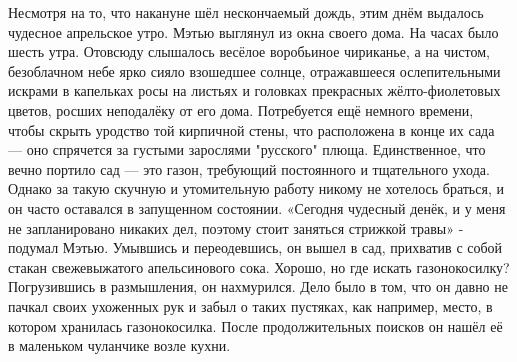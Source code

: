 \documentclass[a4paper,12pt]{book}
\begin{document}
	Несмотря на то, что накануне шёл нескончаемый дождь, этим днём выдалось чудесное апрельское утро.
	Мэтью выглянул из окна своего дома. На часах было шесть утра. Отовсюду слышалось весёлое воробьиное чириканье, а на чистом, безоблачном небе ярко сияло взошедшее солнце, отражавшееся ослепительными искрами в капельках росы на листьях и головках прекрасных жёлто-фиолетовых цветов, росших неподалёку от его дома. Потребуется ещё немного времени, чтобы скрыть уродство той кирпичной стены, что расположена в конце их сада — оно спрячется за густыми зарослями "русского" плюща. Единственное, что вечно портило сад — это газон, требующий постоянного и тщательного ухода. Однако за такую скучную и утомительную работу никому не хотелось браться, и он часто оставался в запущенном состоянии.
	«Сегодня чудесный денёк, и у меня не запланировано никаких дел, поэтому стоит заняться стрижкой травы» - подумал Мэтью.
	Умывшись и переодевшись, он вышел в сад, прихватив с собой стакан свежевыжатого апельсинового сока.
	Хорошо, но где искать газонокосилку?
	Погрузившись в размышления, он нахмурился. Дело было в том, что он давно не пачкал своих ухоженных рук и забыл о таких пустяках, как например, место, в котором хранилась газонокосилка. После продолжительных поисков он нашёл её в маленьком чуланчике возле кухни.
\end{document}
